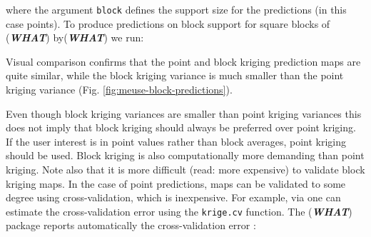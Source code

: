 \documentclass[11pt]{krantz}
\newenvironment{Shaded}{\begin{snugshade}}{\end{snugshade}}
\newcommand{\CommentTok}[1]{\textcolor[rgb]{0.37,0.37,0.37}{\textit{#1}}}
\newcommand{\DataTypeTok}[1]{\textcolor[rgb]{0.27,0.27,0.27}{#1}}
\newcommand{\DecValTok}[1]{\textcolor[rgb]{0.06,0.06,0.06}{#1}}
\newcommand{\KeywordTok}[1]{\textcolor[rgb]{0.27,0.27,0.27}{\textbf{#1}}}
\newcommand{\NormalTok}[1]{#1}
\newcommand{\StringTok}[1]{\textcolor[rgb]{0.5,0.5,0.5}{#1}}
\theoremstyle{definition}
\theoremstyle{definition}
\theoremstyle{definition}
\theoremstyle{remark}
\begin{document}
where the argument \texttt{block} defines the support size for the
predictions (in this case points). To produce predictions on block
support for square blocks of (\textbf{\emph{WHAT}})
by(\textbf{\emph{WHAT}}) we run:

\begin{Shaded}
\end{Shaded}

Visual comparison confirms that the point and block kriging prediction
maps are quite similar, while the block kriging variance is much smaller
than the point kriging variance (Fig.
\ref{fig:meuse-block-predictions}).

Even though block kriging variances are smaller than point kriging
variances this does not imply that block kriging should always be
preferred over point kriging. If the user interest is in point values
rather than block averages, point kriging should be used. Block kriging
is also computationally more demanding than point kriging. Note also
that it is more difficult (read: more expensive) to validate block
kriging maps. In the case of point predictions, maps can be validated to
some degree using cross-validation, which is inexpensive. For example,
via one can estimate the cross-validation error using the
\texttt{krige.cv} function. The (\textbf{\emph{WHAT}}) package reports
automatically the cross-validation error \citep{Hengl2013JAG}:
\end{document}
